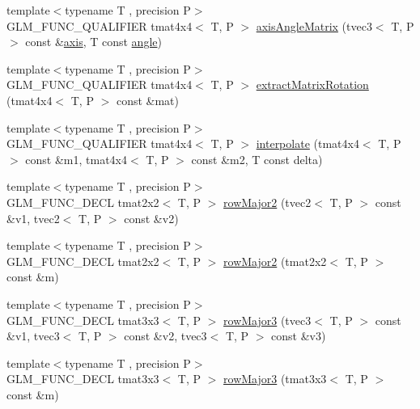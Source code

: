 \begin{DoxyCompactItemize}
\item 
{\footnotesize template$<$typename T , precision P$>$ }\\G\+L\+M\+\_\+\+F\+U\+N\+C\+\_\+\+Q\+U\+A\+L\+I\+F\+I\+E\+R tmat4x4$<$ T, P $>$ \hyperlink{group__gtx__matrix__interpolation_ga82d4bc058e9628cb2ea1d4e117a0cf39}{axis\+Angle\+Matrix} (tvec3$<$ T, P $>$ const \&\hyperlink{group__gtc__quaternion_ga0b3e87a13b2708154b72259e50789a19}{axis}, T const \hyperlink{group__gtc__quaternion_gad4a4448baedb198b2b1e7880d2544dc9}{angle})
\item 
{\footnotesize template$<$typename T , precision P$>$ }\\G\+L\+M\+\_\+\+F\+U\+N\+C\+\_\+\+Q\+U\+A\+L\+I\+F\+I\+E\+R tmat4x4$<$ T, P $>$ \hyperlink{group__gtx__matrix__interpolation_ga6b8170aa4cf43caf81400696ebb38afe}{extract\+Matrix\+Rotation} (tmat4x4$<$ T, P $>$ const \&mat)
\item 
{\footnotesize template$<$typename T , precision P$>$ }\\G\+L\+M\+\_\+\+F\+U\+N\+C\+\_\+\+Q\+U\+A\+L\+I\+F\+I\+E\+R tmat4x4$<$ T, P $>$ \hyperlink{group__gtx__matrix__interpolation_ga45099a92c5c704503565619ac2bcd5c6}{interpolate} (tmat4x4$<$ T, P $>$ const \&m1, tmat4x4$<$ T, P $>$ const \&m2, T const delta)
\item 
{\footnotesize template$<$typename T , precision P$>$ }\\G\+L\+M\+\_\+\+F\+U\+N\+C\+\_\+\+D\+E\+C\+L tmat2x2$<$ T, P $>$ \hyperlink{group__gtx__matrix__major__storage_ga0c7f4d56a85865f0002127119ab7d551}{row\+Major2} (tvec2$<$ T, P $>$ const \&v1, tvec2$<$ T, P $>$ const \&v2)
\item 
{\footnotesize template$<$typename T , precision P$>$ }\\G\+L\+M\+\_\+\+F\+U\+N\+C\+\_\+\+D\+E\+C\+L tmat2x2$<$ T, P $>$ \hyperlink{group__gtx__matrix__major__storage_ga42a006aa66198452bd3c89415f892196}{row\+Major2} (tmat2x2$<$ T, P $>$ const \&m)
\item 
{\footnotesize template$<$typename T , precision P$>$ }\\G\+L\+M\+\_\+\+F\+U\+N\+C\+\_\+\+D\+E\+C\+L tmat3x3$<$ T, P $>$ \hyperlink{group__gtx__matrix__major__storage_gaba4de9afc4e65ec8ea0403e7cba3fb9f}{row\+Major3} (tvec3$<$ T, P $>$ const \&v1, tvec3$<$ T, P $>$ const \&v2, tvec3$<$ T, P $>$ const \&v3)
\item 
{\footnotesize template$<$typename T , precision P$>$ }\\G\+L\+M\+\_\+\+F\+U\+N\+C\+\_\+\+D\+E\+C\+L tmat3x3$<$ T, P $>$ \hyperlink{group__gtx__matrix__major__storage_ga38537061135b55e7a053926ca55e6e20}{row\+Major3} (tmat3x3$<$ T, P $>$ const \&m)

\end{DoxyCompactItemize}
